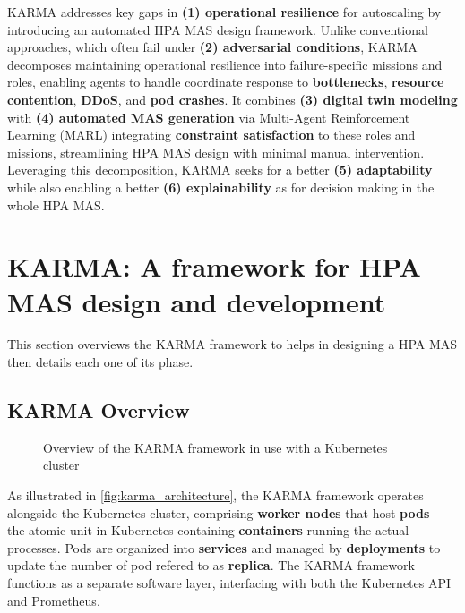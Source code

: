\documentclass[conference]{IEEEtran}
\begin{document}
KARMA addresses key gaps in \textbf{(1) operational resilience} for autoscaling by introducing an automated HPA MAS design framework. Unlike conventional approaches, which often fail under \textbf{(2) adversarial conditions}, KARMA decomposes maintaining operational resilience into failure-specific missions and roles, enabling agents to handle coordinate response to \textbf{bottlenecks}, \textbf{resource contention}, \textbf{DDoS}, and \textbf{pod crashes}. It combines \textbf{(3) digital twin modeling} with \textbf{(4) automated MAS generation} via Multi-Agent Reinforcement Learning (MARL) integrating \textbf{constraint satisfaction} to these roles and missions, streamlining HPA MAS design with minimal manual intervention. Leveraging this decomposition, KARMA seeks for a better \textbf{(5) adaptability} while also enabling a better \textbf{(6) explainability} as for decision making in the whole HPA MAS.


\section{KARMA: A framework for HPA MAS design and development}
\label{sec:proposed_approach}

This section overviews the KARMA framework to helps in designing a HPA MAS then details each one of its phase.

\subsection{KARMA Overview}

\begin{figure}[h!]
    \centering
    
    \caption{Overview of the KARMA framework in use with a Kubernetes cluster}
    \label{fig:karma_architecture}
\end{figure}

As illustrated in \autoref{fig:karma_architecture}, the KARMA framework operates alongside the Kubernetes cluster, comprising \textbf{worker nodes} that host \textbf{pods}—the atomic unit in Kubernetes containing \textbf{containers} running the actual processes. Pods are organized into \textbf{services} and managed by \textbf{deployments} to update the number of pod refered to as \textbf{replica}. The KARMA framework functions as a separate software layer, interfacing with both the Kubernetes API and Prometheus.
\end{document}
